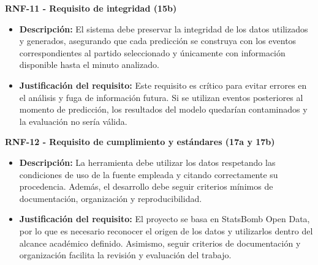 \textbf{RNF-11 - Requisito de integridad (15b)}

\begin{itemize}
    \item \textbf{Descripción:} El sistema debe preservar la integridad de los datos utilizados y generados, asegurando que cada predicción se construya con los eventos correspondientes al partido seleccionado y únicamente con información disponible hasta el minuto analizado.
    \item \textbf{Justificación del requisito:} Este requisito es crítico para evitar errores en el análisis y fuga de información futura. Si se utilizan eventos posteriores al momento de predicción, los resultados del modelo quedarían contaminados y la evaluación no sería válida.
\end{itemize}

\textbf{RNF-12 - Requisito de cumplimiento y estándares (17a y 17b)}

\begin{itemize}
    \item \textbf{Descripción:} La herramienta debe utilizar los datos respetando las condiciones de uso de la fuente empleada y citando correctamente su procedencia. Además, el desarrollo debe seguir criterios mínimos de documentación, organización y reproducibilidad.
    \item \textbf{Justificación del requisito:} El proyecto se basa en StatsBomb Open Data, por lo que es necesario reconocer el origen de los datos y utilizarlos dentro del alcance académico definido. Asimismo, seguir criterios de documentación y organización facilita la revisión y evaluación del trabajo.
\end{itemize}